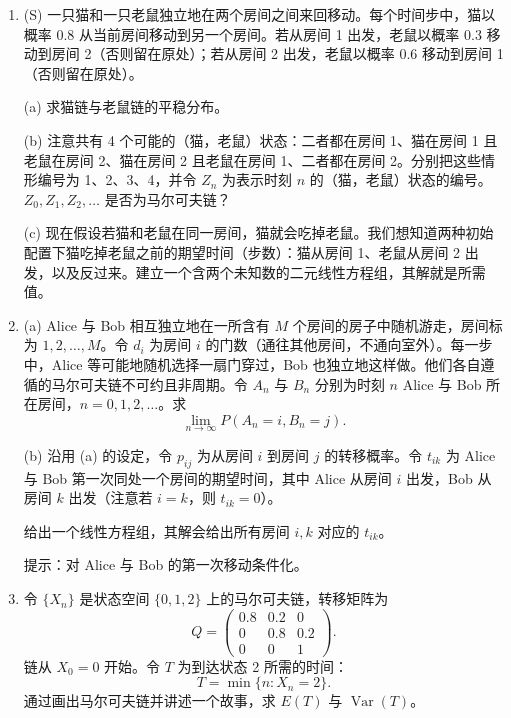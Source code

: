 \documentclass[UTF8, 12pt, fontset=fandol, oneside]{ctexart}
\begin{document}
\begin{enumerate}
提示：令 $w_{ij}=s_iq_{ij}$，其中 $\mathbf s$ 是平稳分布，$q_{ij}$ 是 $Q$ 的 $(i,j)$ 元。

\subsection*{综合练习}

\item[$21.$] \textnormal{(S)} 一只猫和一只老鼠独立地在两个房间之间来回移动。每个时间步中，猫以概率 0.8 从当前房间移动到另一个房间。若从房间 1 出发，老鼠以概率 0.3 移动到房间 2（否则留在原处）；若从房间 2 出发，老鼠以概率 0.6 移动到房间 1（否则留在原处）。

(a) 求猫链与老鼠链的平稳分布。

(b) 注意共有 4 个可能的（猫，老鼠）状态：二者都在房间 1、猫在房间 1 且老鼠在房间 2、猫在房间 2 且老鼠在房间 1、二者都在房间 2。分别把这些情形编号为 1、2、3、4，并令 $Z_n$ 为表示时刻 $n$ 的（猫，老鼠）状态的编号。$Z_0,Z_1,Z_2,\ldots$ 是否为马尔可夫链？

(c) 现在假设若猫和老鼠在同一房间，猫就会吃掉老鼠。我们想知道两种初始配置下猫吃掉老鼠之前的期望时间（步数）：猫从房间 1、老鼠从房间 2 出发，以及反过来。建立一个含两个未知数的二元线性方程组，其解就是所需值。

\item[$22.$] (a) Alice 与 Bob 相互独立地在一所含有 $M$ 个房间的房子中随机游走，房间标为 $1,2,\ldots,M$。令 $d_i$ 为房间 $i$ 的门数（通往其他房间，不通向室外）。每一步中，Alice 等可能地随机选择一扇门穿过，Bob 也独立地这样做。他们各自遵循的马尔可夫链不可约且非周期。令 $A_n$ 与 $B_n$ 分别为时刻 $n$ Alice 与 Bob 所在房间，$n=0,1,2,\ldots$。求
\[
  \lim_{n\to\infty}P(A_n=i,B_n=j).
\]

(b) 沿用 (a) 的设定，令 $p_{ij}$ 为从房间 $i$ 到房间 $j$ 的转移概率。令 $t_{ik}$ 为 Alice 与 Bob 第一次同处一个房间的期望时间，其中 Alice 从房间 $i$ 出发，Bob 从房间 $k$ 出发（注意若 $i=k$，则 $t_{ik}=0$）。

给出一个线性方程组，其解会给出所有房间 $i,k$ 对应的 $t_{ik}$。

提示：对 Alice 与 Bob 的第一次移动条件化。

\item[$23.$] 令 $\{X_n\}$ 是状态空间 $\{0,1,2\}$ 上的马尔可夫链，转移矩阵为
\[
  Q=
  \begin{pmatrix}
    0.8 & 0.2 & 0\\
    0 & 0.8 & 0.2\\
    0 & 0 & 1
  \end{pmatrix}.
\]
链从 $X_0=0$ 开始。令 $T$ 为到达状态 2 所需的时间：
\[
  T=\min\{n:X_n=2\}.
\]
通过画出马尔可夫链并讲述一个故事，求 $E(T)$ 与 $\operatorname{Var}(T)$。


\end{enumerate}
\end{document}
